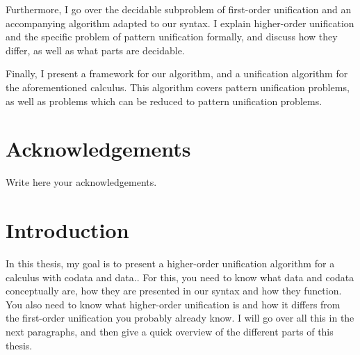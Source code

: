 \documentclass[twoside,12pt,a4paper]{article}
\begin{document}
Furthermore, I go over the decidable subproblem of first-order unification and an accompanying algorithm adapted to our syntax.
I explain higher-order unification and the specific problem of pattern unification formally, 
and discuss how they differ, as well as what parts are decidable.

Finally, I present a framework for our algorithm, and a unification algorithm for the aforementioned calculus. 
This algorithm covers pattern unification problems, as well as problems which can be reduced to pattern unification problems.


\newpage
\section*{Acknowledgements}

Write here your acknowledgements.

\cleardoublepage


\renewcommand{\baselinestretch}{1.3}
\small\normalsize

\tableofcontents

\renewcommand{\baselinestretch}{1}
\small\normalsize

\cleardoublepage


\setcounter{page}{1}

\section{Introduction}

In this thesis, my goal is to present a higher-order unification algorithm for a calculus with codata and data.. 
For this, you need to know what data and codata conceptually are, how they are presented in our syntax and how they function.
You also need to know what higher-order unification is and how it differs from the first-order unification you probably already know.
I will go over all this in the next paragraphs, and then give a quick overview of the different parts of this thesis.
\end{document}
